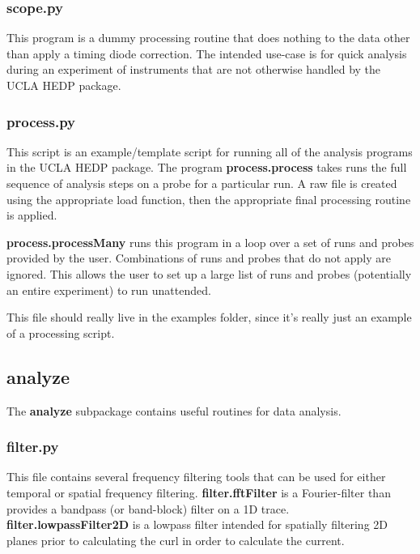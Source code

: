 \documentclass[12pt]{article}
\newcommand{\loc}[1]{{\bf \fontfamily{pcr}\selectfont #1}}
\newcommand{\todo}[1]{ \begin{tcolorbox} \centering  #1 \end{tcolorbox}}
\begin{document}
\subsubsection{\loc{scope.py}}
This program is a dummy processing routine that does nothing to the data other than apply a timing diode correction. The intended use-case is for quick analysis during an experiment of instruments that are not otherwise handled by the UCLA HEDP package.

\subsubsection{\loc{process.py}}
This script is an example/template script for running all of the analysis programs in the UCLA HEDP package. The program \loc{process.process} takes runs the full sequence of analysis steps on a probe for a particular run. A raw file is created using the appropriate load function, then the appropriate final processing routine is applied.

\loc{process.processMany} runs this program in a loop over a set of runs and probes provided by the user. Combinations of runs and probes that do not apply are ignored. This allows the user to set up a large list of runs and probes (potentially an entire experiment) to run unattended.

\todo{This file should really live in the examples folder, since it's really just an example of a processing script.}





\subsection{\loc{analyze}}

The \loc{analyze} subpackage contains useful routines for data analysis. 

\subsubsection{\loc{filter.py}}
This file contains several frequency filtering tools that can be used for either temporal or spatial frequency filtering. \loc{filter.fftFilter} is a Fourier-filter than provides a bandpass (or band-block) filter on a 1D trace. \loc{filter.lowpassFilter2D} is a lowpass filter intended for spatially filtering 2D planes prior to calculating the curl in order to calculate the current.
\end{document}
